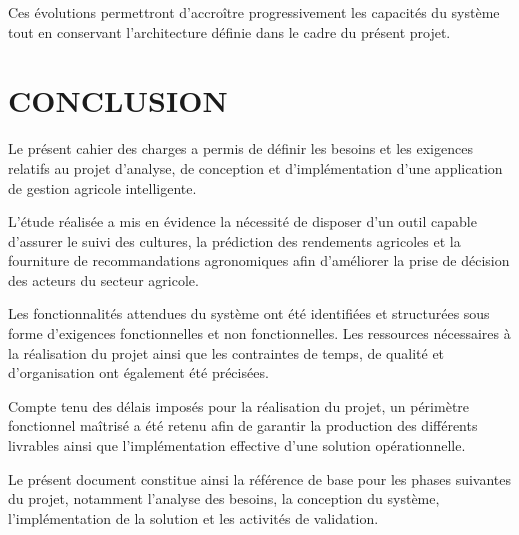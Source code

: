 \documentclass[12pt,a4paper]{report}
\begin{document}
Ces évolutions permettront d'accroître progressivement les capacités du
système tout en conservant l'architecture définie dans le cadre du
présent projet.

\chapter{CONCLUSION}\label{chapitre-7-conclusion}

Le présent cahier des charges a permis de définir les besoins et les
exigences relatifs au projet d'analyse, de conception et
d'implémentation d'une application de gestion agricole intelligente.

L'étude réalisée a mis en évidence la nécessité de disposer d'un outil
capable d'assurer le suivi des cultures, la prédiction des rendements
agricoles et la fourniture de recommandations agronomiques afin
d'améliorer la prise de décision des acteurs du secteur agricole.

Les fonctionnalités attendues du système ont été identifiées et
structurées sous forme d'exigences fonctionnelles et non fonctionnelles.
Les ressources nécessaires à la réalisation du projet ainsi que les
contraintes de temps, de qualité et d'organisation ont également été
précisées.

Compte tenu des délais imposés pour la réalisation du projet, un
périmètre fonctionnel maîtrisé a été retenu afin de garantir la
production des différents livrables ainsi que l'implémentation effective
d'une solution opérationnelle.

Le présent document constitue ainsi la référence de base pour les phases
suivantes du projet, notamment l'analyse des besoins, la conception du
système, l'implémentation de la solution et les activités de validation.
\end{document}
